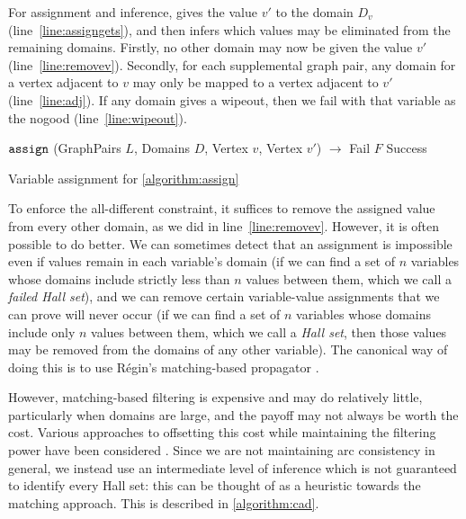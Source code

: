 \documentclass{llncs}
\newcommand{\lineref}[1]{line~\ref{#1}}
\begin{document}
For assignment and inference,  gives the value $v'$ to the domain $D_v$
(\lineref{line:assigngets}), and then infers which values may be eliminated from the remaining
domains.  Firstly, no other domain may now be given the value $v'$ (\lineref{line:removev}).
Secondly, for each supplemental graph pair, any domain for a vertex adjacent to $v$ may only be
mapped to a vertex adjacent to $v'$ (\lineref{line:adj}). If any domain gives a wipeout, then we
fail with that variable as the nogood (\lineref{line:wipeout}).

\begin{algorithm}[t]
\DontPrintSemicolon
\nl $\FuncSty{assign}$ (GraphPairs $L$, Domains $D$, Vertex $v$, Vertex $v'$) $\rightarrow$ Fail $F$  Success \;
\nl {}
\caption{Variable assignment for \cref{algorithm:assign}}
\label{algorithm:assign}
\end{algorithm}

To enforce the all-different constraint, it suffices to remove the assigned value from every other
domain, as we did in \lineref{line:removev}. However, it is often possible to do better. We can
sometimes detect that an assignment is impossible even if values remain in each variable's domain
(if we can find a set of $n$ variables whose domains include strictly less than $n$ values between
them, which we call a \emph{failed Hall set}), and we can remove certain variable-value assignments
that we can prove will never occur (if we can find a set of $n$ variables whose domains include only
$n$ values between them, which we call a \emph{Hall set}, then those values may be removed from the
domains of any other variable). The canonical way of doing this is to use R\'egin's matching-based
propagator \cite{Regin:1994}.

However, matching-based filtering is expensive and may do relatively little, particularly when
domains are large, and the payoff may not always be worth the cost. Various approaches to offsetting
this cost while maintaining the filtering power have been considered \cite{Gent:2008}. Since we are
not maintaining arc consistency in general, we instead use an intermediate level of inference which
is not guaranteed to identify every Hall set: this can be thought of as a heuristic towards the
matching approach. This is described in \cref{algorithm:cad}.
\end{document}
